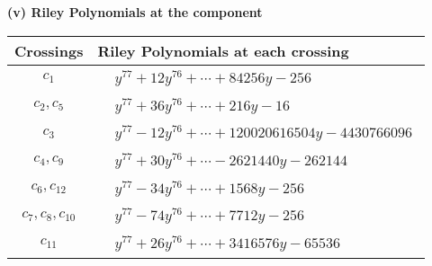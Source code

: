 \documentclass[1p]{elsarticle_modified}
\theoremstyle{definition}
\begin{document}
\flushleft \textbf{(v) Riley Polynomials at the component}\newline \\
\begin{tabular}{m{50pt}|m{274pt}}
Crossings & \hspace{64pt}Riley Polynomials at each crossing \\
\hline $$\begin{aligned}c_{1}\end{aligned}$$&$\begin{aligned}
&y^{77}+12 y^{76}+\cdots+84256 y-256
\end{aligned}$\\
\hline $$\begin{aligned}c_{2},c_{5}\end{aligned}$$&$\begin{aligned}
&y^{77}+36 y^{76}+\cdots+216 y-16
\end{aligned}$\\
\hline $$\begin{aligned}c_{3}\end{aligned}$$&$\begin{aligned}
&y^{77}-12 y^{76}+\cdots+120020616504 y-4430766096
\end{aligned}$\\
\hline $$\begin{aligned}c_{4},c_{9}\end{aligned}$$&$\begin{aligned}
&y^{77}+30 y^{76}+\cdots-2621440 y-262144
\end{aligned}$\\
\hline $$\begin{aligned}c_{6},c_{12}\end{aligned}$$&$\begin{aligned}
&y^{77}-34 y^{76}+\cdots+1568 y-256
\end{aligned}$\\
\hline $$\begin{aligned}c_{7},c_{8},c_{10}\end{aligned}$$&$\begin{aligned}
&y^{77}-74 y^{76}+\cdots+7712 y-256
\end{aligned}$\\
\hline $$\begin{aligned}c_{11}\end{aligned}$$&$\begin{aligned}
&y^{77}+26 y^{76}+\cdots+3416576 y-65536
\end{aligned}$\\
\hline
\end{tabular}\\~\\
\end{document}
